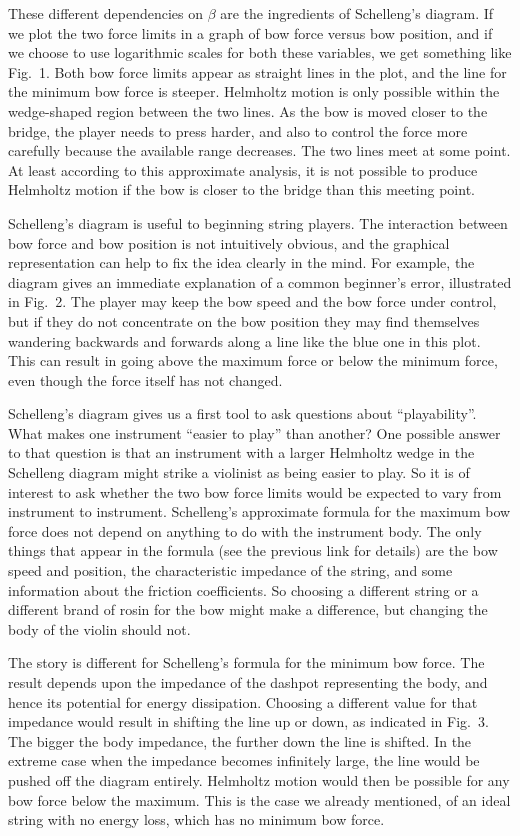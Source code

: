   These different dependencies on $\beta$ are the ingredients of Schelleng’s 
  diagram. If we plot the two force limits in a graph of bow force versus bow 
  position, and if we choose to use logarithmic scales for both these 
  variables, we get something like Fig.\ 1. Both bow force limits appear as 
  straight lines in the plot, and the line for the minimum bow force is 
  steeper. Helmholtz motion is only possible within the wedge-shaped region 
  between the two lines. As the bow is moved closer to the bridge, the player 
  needs to press harder, and also to control the force more carefully because 
  the available range decreases. The two lines meet at some point. At least 
  according to this approximate analysis, it is not possible to produce 
  Helmholtz motion if the bow is closer to the bridge than this meeting point. 

  Schelleng’s diagram is useful to beginning string players. The interaction 
  between bow force and bow position is not intuitively obvious, and the 
  graphical representation can help to fix the idea clearly in the mind. For 
  example, the diagram gives an immediate explanation of a common beginner’s 
  error, illustrated in Fig.\ 2. The player may keep the bow speed and the bow 
  force under control, but if they do not concentrate on the bow position they 
  may find themselves wandering backwards and forwards along a line like the 
  blue one in this plot. This can result in going above the maximum force or 
  below the minimum force, even though the force itself has not changed. 

  Schelleng’s diagram gives us a first tool to ask questions about 
  “playability”. What makes one instrument “easier to play” than another? One 
  possible answer to that question is that an instrument with a larger 
  Helmholtz wedge in the Schelleng diagram might strike a violinist as being 
  easier to play. So it is of interest to ask whether the two bow force limits 
  would be expected to vary from instrument to instrument. Schelleng’s 
  approximate formula for the maximum bow force does not depend on anything to 
  do with the instrument body. The only things that appear in the formula (see 
  the previous link for details) are the bow speed and position, the 
  characteristic impedance of the string, and some information about the 
  friction coefficients. So choosing a different string or a different brand of 
  rosin for the bow might make a difference, but changing the body of the 
  violin should not. 

  The story is different for Schelleng’s formula for the minimum bow force. The 
  result depends upon the impedance of the dashpot representing the body, and 
  hence its potential for energy dissipation. Choosing a different value for 
  that impedance would result in shifting the line up or down, as indicated in 
  Fig.\ 3. The bigger the body impedance, the further down the line is shifted. 
  In the extreme case when the impedance becomes infinitely large, the line 
  would be pushed off the diagram entirely. Helmholtz motion would then be 
  possible for any bow force below the maximum. This is the case we already 
  mentioned, of an ideal string with no energy loss, which has no minimum bow 
  force. 

